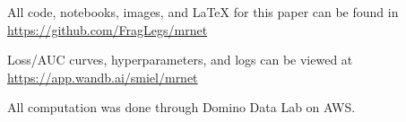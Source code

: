 \documentclass[10pt,letterpaper]{article}
\begin{document}
All code, notebooks, images, and LaTeX for this paper can be found in
\href{https://github.com/FragLegs/mrnet}{https://github.com/FragLegs/mrnet}
$$$$

Loss/AUC curves, hyperparameters, and logs can be viewed at
\href{https://app.wandb.ai/smiel/mrnet}{https://app.wandb.ai/smiel/mrnet}
$$$$

All computation was done through Domino Data Lab on AWS.
\end{document}
